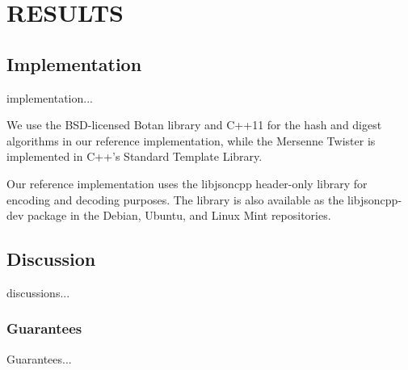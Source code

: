 
\chapter{RESULTS}

\section{Implementation}

implementation...

We use the BSD-licensed Botan library and C++11 for the hash and digest algorithms in our reference implementation, while the Mersenne Twister is implemented in C++'s Standard Template Library.

Our reference implementation uses the libjsoncpp header-only library for encoding and decoding purposes. The library is also available as the libjsoncpp-dev package in the Debian, Ubuntu, and Linux Mint repositories.

\section{Discussion}

discussions...

\subsection{Guarantees}

Guarantees...